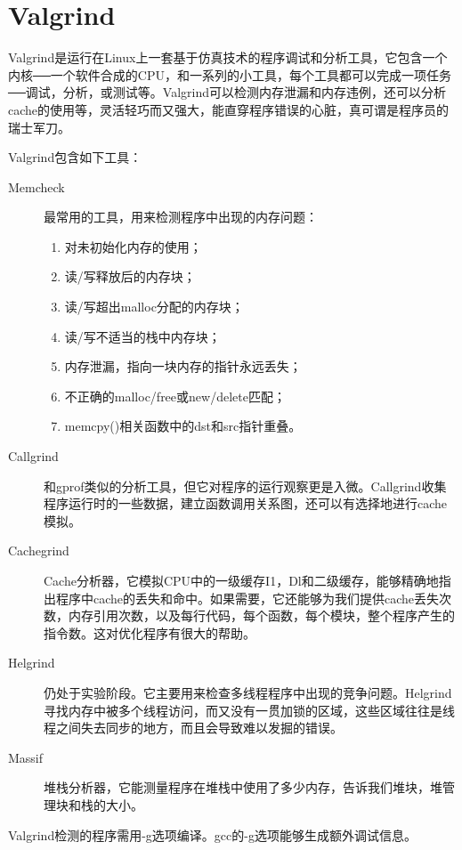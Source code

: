 
\section{Valgrind}

Valgrind是运行在Linux上一套基于仿真技术的程序调试和分析工具，它包含一个内核──一个软件合成的CPU，和一系列的小工具，每个工具都可以完成一项任务──调试，分析，或测试等。Valgrind可以检测内存泄漏和内存违例，还可以分析cache的使用等，灵活轻巧而又强大，能直穿程序错误的心脏，真可谓是程序员的瑞士军刀。

Valgrind包含如下工具：
\begin{description}
  \item[Memcheck]最常用的工具，用来检测程序中出现的内存问题：
    \begin{enumerate}
        \item 对未初始化内存的使用； 
        \item 读/写释放后的内存块； 
        \item 读/写超出malloc分配的内存块； 
        \item 读/写不适当的栈中内存块； 
        \item 内存泄漏，指向一块内存的指针永远丢失； 
        \item 不正确的malloc/free或new/delete匹配； 
        \item memcpy()相关函数中的dst和src指针重叠。
     \end{enumerate} 
    \item[Callgrind]和gprof类似的分析工具，但它对程序的运行观察更是入微。Callgrind收集程序运行时的一些数据，建立函数调用关系图，还可以有选择地进行cache模拟。
    \item[Cachegrind]Cache分析器，它模拟CPU中的一级缓存I1，Dl和二级缓存，能够精确地指出程序中cache的丢失和命中。如果需要，它还能够为我们提供cache丢失次数，内存引用次数，以及每行代码，每个函数，每个模块，整个程序产生的指令数。这对优化程序有很大的帮助。
    \item[Helgrind]仍处于实验阶段。它主要用来检查多线程程序中出现的竞争问题。Helgrind寻找内存中被多个线程访问，而又没有一贯加锁的区域，这些区域往往是线程之间失去同步的地方，而且会导致难以发掘的错误。
    \item[Massif]堆栈分析器，它能测量程序在堆栈中使用了多少内存，告诉我们堆块，堆管理块和栈的大小。
\end{description}

Valgrind检测的程序需用-g选项编译。gcc的-g选项能够生成额外调试信息。

